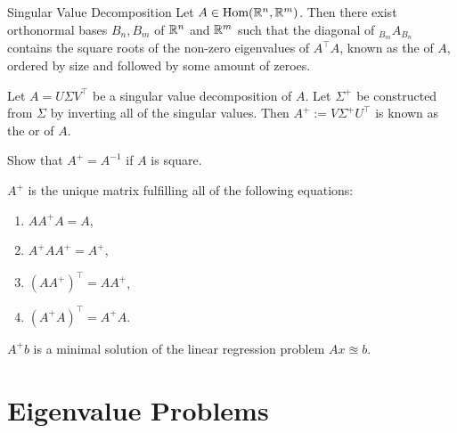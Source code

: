 \begin{importanttheorem}{Singular Value Decomposition}{}
	Let $A \in \textnormal{Hom}(\mathbb{R}^n, \mathbb{R}^m)$. Then there exist orthonormal bases $B_n, B_m$ of $\mathbb{R}^n$ and $\mathbb{R}^m$ such that the diagonal of $_{B_m}A_{B_n}$ contains the square roots of the non-zero eigenvalues of $A^\top A$, known as the  of $A$, ordered by size and followed by some amount of zeroes.
\end{importanttheorem}
\begin{definition}
	Let $A = U \Sigma V^\top$ be a singular value decomposition of $A$. Let $\Sigma^+$ be constructed from $\Sigma$ by inverting all of the singular values. Then
	$A^+ := V\Sigma^+U^\top$ is known as the  or  of $A$.
\end{definition}
\begin{exercise}
	Show that $A^+ = A^{-1}$ if $A$ is square.
\end{exercise}
\begin{proposition}
	$A^+$ is the unique matrix fulfilling all of the following equations:
	\begin{enumerate}
		\item $AA^+A = A$,
		\item $A^+AA^+ = A^+$,
		\item $(AA^+)^\top = AA^+$,
		\item $(A^+A)^\top = A^+A$.
	\end{enumerate}
\end{proposition}
\begin{theorem}
	$A^+b$ is a minimal solution of the linear regression problem $Ax \approxeq b$.
\end{theorem}

\section{Eigenvalue Problems}
